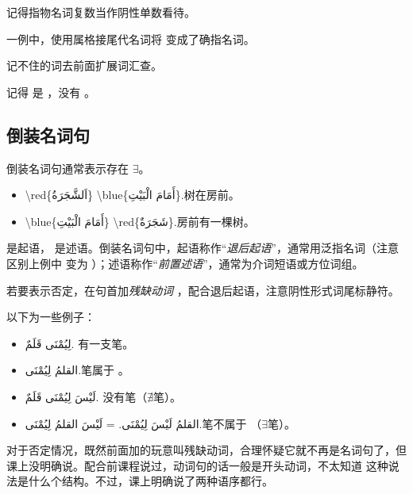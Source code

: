 \begin{attention}
    记得指物名词复数当作阴性单数看待。

     一例中，使用属格接尾代名词将  变成了确指名词。
\end{attention}

\begin{note}
    记不住的词去前面扩展词汇查。

    记得  是  ，没有 。
\end{note}

\subsection{倒装名词句}

倒装名词句通常表示存在 $\exists$。

\begin{itemize}
    \item \ac{\red{اَلشَّجَرَةُ} \blue{أَمَامَ الْبَيْتِ}.}{树在房前。}
    \item \ac{\blue{أَمَامَ الْبَيْتِ} \red{شَجَرَةٌ}.}{房前有一棵树。}
\end{itemize}

 是起语， 是述语。倒装名词句中，起语称作``\emph{退后起语}''，通常用泛指名词（注意区别上例中  变为 ）；述语称作``\emph{前置述语}''，通常为介词短语或方位词组。

若要表示否定，在句首加\emph{残缺动词}  ，配合退后起语，注意阴性形式词尾标静符。

以下为一些例子：

\begin{itemize}
    \item \ac{لِيُمْنَى قَلَمٌ.}{ 有一支笔。}
    \item \ac{القلمُ لِيُمْنَى.}{笔属于 。}
    \item \ac{لَيْسَ لِيُمْنَى قَلَمٌ.}{ 没有笔（$\nexists$笔）。}
    \item \ac{القلمُ لَيْسَ لِيُمْنَى. = لَيْسَ القلمُ لِيُمْنَى.}{笔不属于 （$\exists$笔）。}
\end{itemize}

\begin{note}
    对于否定情况，既然前面加的玩意叫残缺动词，合理怀疑它就不再是名词句了，但课上没明确说。配合前课程说过，动词句的话一般是开头动词，不太知道  这种说法是什么个结构。不过，课上明确说了两种语序都行。
\end{note}

